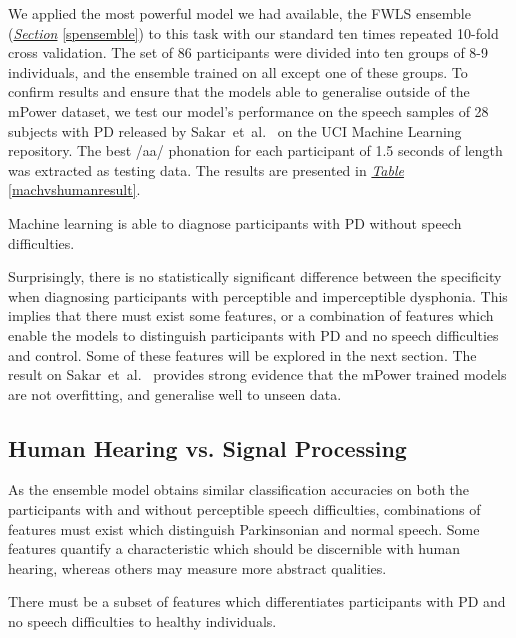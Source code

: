 \documentclass[12pt, twoside]{book}
\begin{document}
We applied the most powerful model we had available, the FWLS ensemble (\textit{\hyperref[spensemble]{Section}} \ref{spensemble}) to this task with our standard ten times repeated 10-fold cross validation. The set of 86 participants were divided into ten groups of 8-9 individuals, and the ensemble trained on all except one of these groups. To confirm results and ensure that the models able to generalise outside of the mPower dataset, we test our model's performance on the speech samples of 28 subjects with PD released by Sakar~et~al.~\cite{sakar2012} on the UCI Machine Learning repository. The best /aa/ phonation for each participant of 1.5 seconds of length was extracted as testing data. The results are presented in \textit{\hyperref[machvshumanresult]{Table}} \ref{machvshumanresult}. 



\vspace{-0.1em}
\begin{highlight}
	Machine learning is able to diagnose participants with PD without speech difficulties.
\end{highlight}
\vspace{-0.2em}
Surprisingly, there is no statistically significant difference between the specificity when diagnosing participants with perceptible and imperceptible dysphonia. This implies that there must exist some features, or a combination of features which enable the models to distinguish participants with PD and no speech difficulties and control. Some of these features will be explored in the next section. The result on Sakar~et~al.~\cite{sakar2012} provides strong evidence that the mPower trained models are not overfitting, and generalise well to unseen data. 


\vspace{-0.2em}
\subsection{Human Hearing vs. Signal Processing}
\vspace{-0.1em}
\label{formalfeatures}
As the ensemble model obtains similar classification accuracies on both the participants with and without perceptible speech difficulties, combinations of features must exist which distinguish Parkinsonian and normal speech. Some features quantify a characteristic which should be discernible with human hearing, whereas others may measure more abstract qualities. 

\vspace{-0.1em}
\begin{highlight}
	There must be a subset of features which differentiates participants with PD and no speech difficulties to healthy individuals.	
\end{highlight}
\end{document}
